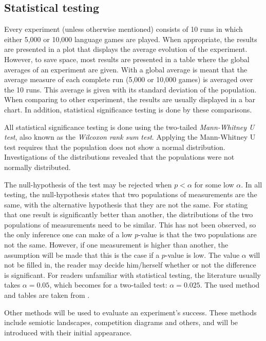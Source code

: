 \subsection{Statistical testing}

Every experiment (unless otherwise mentioned) consists of 10 runs in which either 5,000 or 10,000 language games are played. When appropriate, the results are presented in a plot that displays the average evolution of the experiment. However, to save space, most results are presented in a table where the global averages of an experiment are given. With a global average is meant that the average measure of each complete run (5,000 or 10,000 games) is averaged over the 10 runs. This average is given with its standard deviation of the population. When comparing to other experiment, the results are usually displayed in a bar chart. In addition, statistical significance testing is done by these comparisons.
	
 All statistical significance testing is done using the two-tailed {\em Mann-Whitney U test}, also known as the {\em Wilcoxon rank sum test}. Applying the Mann-Whitney U test requires that the population does not show a normal distribution. Investigations of the distributions revealed that the populations were not normally distributed. 

The null-hypothesis of the test may be rejected when $p<\alpha$ for some low $\alpha$. In all testing, the null-hypothesis states that two populations of measurements are the same, with the alternative hypothesis that they are not the same. For stating that one result is significantly better than another, the distributions of the two populations of measurements need to be similar. This has not been observed, so the only inference one can make of a low $p$-value is that the two populations are not the same. However, if one measurement is higher than another, the assumption will be made that this is the case if a $p$-value is low. The value $\alpha$ will not be filled in, the reader may decide him/herself whether or not the difference is significant. For readers unfamiliar with statistical testing, the literature usually takes $\alpha=0.05$, which becomes for a two-tailed test: $\alpha=0.025$. The used method and tables are taken from \citet{aczel:1989}.


Other methods will be used to evaluate an experiment's success.
These methods include semiotic landscapes, competition diagrams and others, and
will be introduced with their initial appearance.


